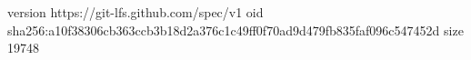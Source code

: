 version https://git-lfs.github.com/spec/v1
oid sha256:a10f38306cb363ccb3b18d2a376c1c49ff0f70ad9d479fb835faf096c547452d
size 19748
